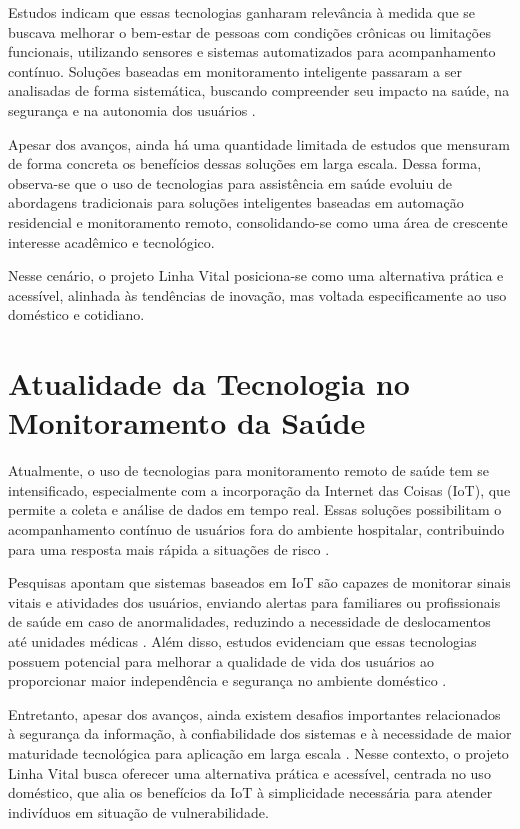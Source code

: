 Estudos indicam que essas tecnologias ganharam relevância à medida que se buscava melhorar o bem-estar de pessoas com condições crônicas ou limitações funcionais, utilizando sensores e sistemas automatizados para acompanhamento contínuo. Soluções baseadas em monitoramento inteligente passaram a ser analisadas de forma sistemática, buscando compreender seu impacto na saúde, na segurança e na autonomia dos usuários \cite{ambientassistedliving2016}.

Apesar dos avanços, ainda há uma quantidade limitada de estudos que mensuram de forma concreta os benefícios dessas soluções em larga escala. Dessa forma, observa-se que o uso de tecnologias para assistência em saúde evoluiu de abordagens tradicionais para soluções inteligentes baseadas em automação residencial e monitoramento remoto, consolidando-se como uma área de crescente interesse acadêmico e tecnológico.

Nesse cenário, o projeto Linha Vital posiciona-se como uma alternativa prática e acessível, alinhada às tendências de inovação, mas voltada especificamente ao uso doméstico e cotidiano.

\section{Atualidade da Tecnologia no Monitoramento da Saúde}

Atualmente, o uso de tecnologias para monitoramento remoto de saúde tem se intensificado, especialmente com a incorporação da Internet das Coisas (IoT), que permite a coleta e análise de dados em tempo real. Essas soluções possibilitam o acompanhamento contínuo de usuários fora do ambiente hospitalar, contribuindo para uma resposta mais rápida a situações de risco \cite{iothealthcare2020,predictivehealthcare2020}.

Pesquisas apontam que sistemas baseados em IoT são capazes de monitorar sinais vitais e atividades dos usuários, enviando alertas para familiares ou profissionais de saúde em caso de anormalidades, reduzindo a necessidade de deslocamentos até unidades médicas \cite{iothealthcare2020}. Além disso, estudos evidenciam que essas tecnologias possuem potencial para melhorar a qualidade de vida dos usuários ao proporcionar maior independência e segurança no ambiente doméstico \cite{smarthomehealth2019}.

Entretanto, apesar dos avanços, ainda existem desafios importantes relacionados à segurança da informação, à confiabilidade dos sistemas e à necessidade de maior maturidade tecnológica para aplicação em larga escala \cite{predictivehealthcare2020}. Nesse contexto, o projeto Linha Vital busca oferecer uma alternativa prática e acessível, centrada no uso doméstico, que alia os benefícios da IoT à simplicidade necessária para atender indivíduos em situação de vulnerabilidade.

